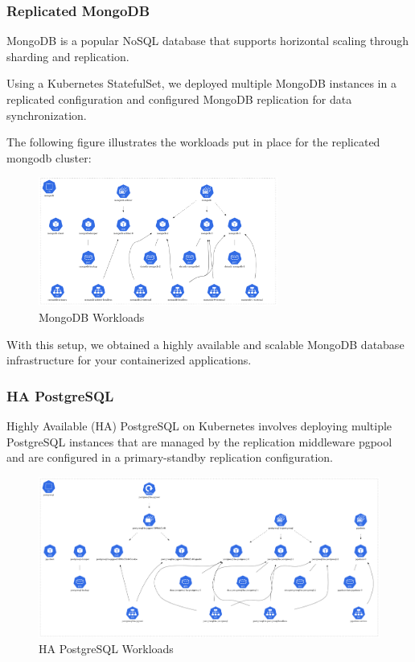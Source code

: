 \subsubsection{Replicated MongoDB }

MongoDB is a popular NoSQL database that supports horizontal scaling through sharding and replication.

Using a Kubernetes StatefulSet, we deployed multiple MongoDB instances in a replicated configuration and configured MongoDB replication for data synchronization.

The following figure illustrates the workloads put in place for the replicated mongodb cluster: 


\begin{figure}[H]\centering
\includegraphics[width=0.7\textwidth,angle=00]{assets/f36.png}
\caption{MongoDB Workloads }
\label{fig:MongoDB Workloads}
\end{figure}

With this setup, we obtained a highly available and scalable MongoDB database infrastructure for your containerized applications. 

\subsubsection{HA PostgreSQL }

Highly Available (HA) PostgreSQL on Kubernetes involves deploying multiple PostgreSQL instances that are managed by the replication middleware pgpool and are configured in a primary-standby replication configuration.

\begin{figure}[H]\centering
\includegraphics[width=1.0\textwidth,angle=00]{assets/f37.png}
\caption{HA PostgreSQL Workloads}
\label{fig:f37}
\end{figure}

